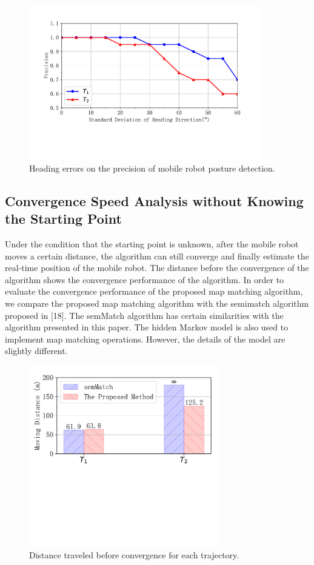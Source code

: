 \documentclass{llncs}
\begin{document}
\begin{figure}[!htbp]
	\centering
	\includegraphics[width=3.976in]{RobotMatch-HeadingError}
	\caption{Heading errors on the precision of mobile robot posture detection.}
	\label{fig-headingerror}
\end{figure}

\subsection{Convergence Speed Analysis without Knowing the Starting Point}

Under the condition that the starting point is unknown, after the mobile robot moves a certain distance, the algorithm can still converge and finally estimate the real-time position of the mobile robot. The distance before the convergence of the algorithm shows the convergence performance of the algorithm. In order to evaluate the convergence performance of the proposed map matching algorithm, we compare the proposed map matching algorithm with the semimatch algorithm proposed in [18]. The semMatch algorithm has certain similarities with the algorithm presented in this paper. The hidden Markov model is also used to implement map matching operations. However, the details of the model are slightly different.

\begin{figure}[!htbp]
	\centering
	\includegraphics[width=3.276in]{RobotMatch-Convergence}
	\caption{Distance traveled before convergence for each trajectory.}
	\label{fig-convergence}
\end{figure}
\end{document}
